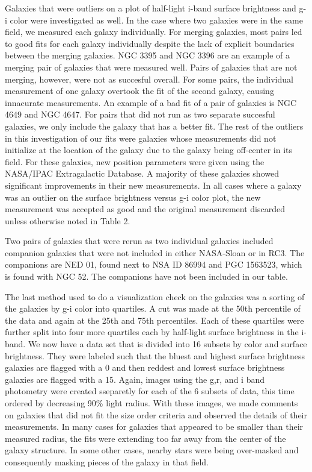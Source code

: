 \documentclass[12pt,preprint,pdftex]{aastex}
\begin{document}
Galaxies that were outliers on a plot of half-light i-band surface
brightness and g-i color were investigated as well. In the case where
two galaxies were in the same field, we measured each galaxy
individually. For merging galaxies, most pairs led to good fits for
each galaxy individually despite the lack of explicit boundaries
between the merging galaxies. NGC 3395 and NGC 3396 are an example of
a merging pair of galaxies that were measured well. Pairs of galaxies
that are not merging, however, were not as succesful overall. For some
pairs, the individual measurement of one galaxy overtook the fit of
the second galaxy, causing innacurate measurements. An example of a
bad fit of a pair of galaxies is NGC 4649 and NGC 4647. For pairs that
did not run as two separate succesful galaxies, we only include the
galaxy that has a better fit. The rest of the outliers in this
investigation of our fits were galaxies whose measurements did not
initialize at the location of the galaxy due to the galaxy being
off-center in its field. For these galaxies, new position parameters
were given using the NASA/IPAC Extragalactic Database. A majority of
these galaxies showed significant improvements in their new
measurements. In all cases where a galaxy was an outlier on the
surface brightness versus g-i color plot, the new measurement was
accepted as good and the original measurement discarded unless
otherwise noted in Table 2.

Two pairs of galaxies that were rerun as two individual galaxies
included companion galaxies that were not included in either
NASA-Sloan or in RC3. The companions are NED 01, found next to NSA ID
86994 and PGC 1563523, which is found with NGC 52. The companions have
not been included in our table.

The last method used to do a visualization check on the galaxies was a
sorting of the galaxies by g-i color into quartiles. A cut was made at
the 50th percentile of the data and again at the 25th and 75th
percentiles. Each of these quartiles were further split into four more
quartiles each by half-light surface brightness in the i-band. We now
have a data set that is divided into 16 subsets by color and surface
brightness. They were labeled such that the bluest and highest surface
brightness galaxies are flagged with a 0 and then reddest and lowest
surface brightness galaxies are flagged with a 15. Again, images using
the g,r, and i band photometry were created sseparetly for each of the
6 subsets of data, this time ordered by decreasing 90\% light
radius. With these images, we made comments on galaxies that did not
fit the size order criteria and observed the details of their
measurements. In many cases for galaxies that appeared to be smaller
than their measured radius, the fits were extending too far away from
the center of the galaxy structure. In some other cases, nearby stars
were being over-masked and consequently masking pieces of the galaxy
in that field.
\end{document}
